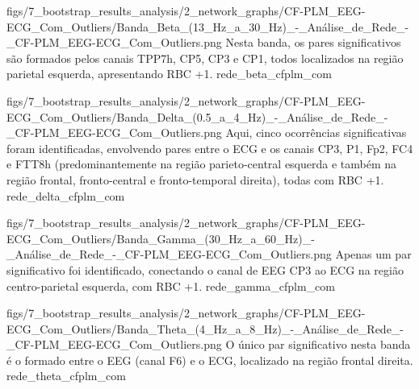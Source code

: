 \ultrawidefigure
{figs/7_bootstrap_results_analysis/2_network_graphs/CF-PLM_EEG-ECG_Com_Outliers/Banda_Beta_(13_Hz_a_30_Hz)_-_Análise_de_Rede_-_CF-PLM_EEG-ECG_Com_Outliers.png}
{Nesta banda, os pares significativos são formados pelos canais TPP7h, CP5, CP3 e CP1, todos localizados na região parietal esquerda, apresentando RBC +1.}
{rede_beta_cfplm_com}

\ultrawidefigure
{figs/7_bootstrap_results_analysis/2_network_graphs/CF-PLM_EEG-ECG_Com_Outliers/Banda_Delta_(0.5_a_4_Hz)_-_Análise_de_Rede_-_CF-PLM_EEG-ECG_Com_Outliers.png}
{Aqui, cinco ocorrências significativas foram identificadas, envolvendo pares entre o ECG e os canais CP3, P1, Fp2, FC4 e FTT8h (predominantemente na região parieto-central esquerda e também na região frontal, fronto-central e fronto-temporal direita), todas com RBC +1.}
{rede_delta_cfplm_com}

\ultrawidefigure
{figs/7_bootstrap_results_analysis/2_network_graphs/CF-PLM_EEG-ECG_Com_Outliers/Banda_Gamma_(30_Hz_a_60_Hz)_-_Análise_de_Rede_-_CF-PLM_EEG-ECG_Com_Outliers.png}
{Apenas um par significativo foi identificado, conectando o canal de EEG CP3 ao ECG na região centro-parietal esquerda, com RBC +1.}
{rede_gamma_cfplm_com}

\ultrawidefigure
{figs/7_bootstrap_results_analysis/2_network_graphs/CF-PLM_EEG-ECG_Com_Outliers/Banda_Theta_(4_Hz_a_8_Hz)_-_Análise_de_Rede_-_CF-PLM_EEG-ECG_Com_Outliers.png}
{O único par significativo nesta banda é o formado entre o EEG (canal F6) e o ECG, localizado na região frontal direita.}
{rede_theta_cfplm_com}